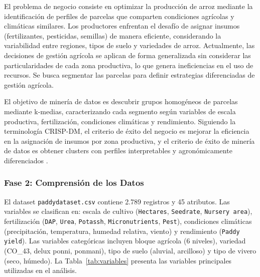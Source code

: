 \documentclass[10pt,a4paper]{article}
\begin{document}
El problema de negocio consiste en optimizar la producción de arroz mediante la identificación de perfiles de parcelas que comparten condiciones agrícolas y climáticas similares. Los productores enfrentan el desafío de asignar insumos (fertilizantes, pesticidas, semillas) de manera eficiente, considerando la variabilidad entre regiones, tipos de suelo y variedades de arroz. Actualmente, las decisiones de gestión agrícola se aplican de forma generalizada sin considerar las particularidades de cada zona productiva, lo que genera ineficiencias en el uso de recursos. Se busca segmentar las parcelas para definir estrategias diferenciadas de gestión agrícola.

El objetivo de minería de datos es descubrir grupos homogéneos de parcelas mediante k-medias, caracterizando cada segmento según variables de escala productiva, fertilización, condiciones climáticas y rendimiento. Siguiendo la terminología CRISP-DM, el criterio de éxito del negocio es mejorar la eficiencia en la asignación de insumos por zona productiva, y el criterio de éxito de minería de datos es obtener clusters con perfiles interpretables y agronómicamente diferenciados \parencite{chapman2000}.

\subsubsection{Fase 2: Comprensión de los Datos}

El dataset \texttt{paddydataset.csv} contiene 2.789 registros y 45 atributos. Las variables se clasifican en: escala de cultivo (\texttt{Hectares}, \texttt{Seedrate}, \texttt{Nursery area}), fertilización (\texttt{DAP}, \texttt{Urea}, \texttt{Potassh}, \texttt{Micronutrients}, \texttt{Pest}), condiciones climáticas (precipitación, temperatura, humedad relativa, viento) y rendimiento (\texttt{Paddy yield}). Las variables categóricas incluyen bloque agrícola (6 niveles), variedad (CO\_43, delux ponni, ponmani), tipo de suelo (aluvial, arcilloso) y tipo de vivero (seco, húmedo). La Tabla~\ref{tab:variables} presenta las variables principales utilizadas en el análisis.
\end{document}
